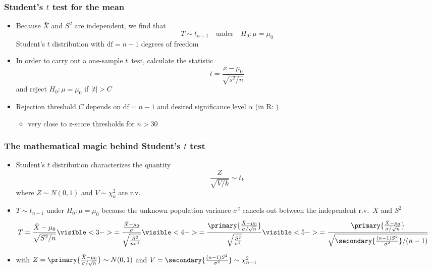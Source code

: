 \documentclass[t]{beamer} %
\begin{document}
\begin{frame}
  \frametitle{Student's $t$ test for the mean}

  \begin{itemize}
  \item Because $\bar{X}$ and $S^2$ are independent, we find that
    \[
    T \sim t_{n-1} \quad\text{under}\quad H_0: \mu = \mu_0
    \]
    Student's \h{$t$ distribution} with $\text{df} = n-1$ degrees of freedom
  \item<2-> In order to carry out a one-sample $t$~test, calculate the statistic
    \[
    t = \frac{\bar{x} - \mu_0}{\sqrt{s^2 / n}}    
    \]
    and reject $H_0: \mu=\mu_0$ if $\lvert t\rvert > C$
  \item<3-> Rejection threshold $C$ depends on $\text{df} = n-1$ and desired
    significance level $\alpha$ (in R: )
    \begin{itemize}
    \item[\hand] very close to z-score thresholds for $n > 30$
    \end{itemize}
  \end{itemize}
\end{frame}

\begin{frame}
  \frametitle{The mathematical magic behind Student's $t$ test}

  \begin{itemize}
  \item Student's $t$ distribution characterizes the quantity
    \[
    \frac{Z}{\sqrt{V / k}} \sim t_k
    \]
    where $Z\sim N(0, 1)$ and $V\sim \chi^2_k$ are  r.v.
  \item<2-> $T\sim t_{n-1}$ under $H_0: \mu = \mu_0$ because the unknown population variance $\sigma^2$ cancels out between the independent r.v.\ $\bar{X}$ and $S^2$
    \begin{align*}
      T &= \frac{\bar{X} - \mu_0}{\sqrt{S^2 / n}}
      \visible<3->{
        = \frac{\frac{\bar{X} - \mu_0}{\sigma}}{\sqrt{\frac{S^2}{n\sigma^2}}}
      }
      \visible<4->{
        = \frac{\primary{\frac{\bar{X} - \mu_0}{\sigma / \sqrt{n}}}}{\sqrt{\frac{S^2}{\sigma^2}}}
      }
      \visible<5->{
        = \frac{\primary{\frac{\bar{X} - \mu_0}{\sigma / \sqrt{n}}}}{\sqrt{\secondary{\frac{(n-1) S^2}{\sigma^2}} / (n-1)}}
      }
    \end{align*}
  \item<6->[] with $Z = \primary{\frac{\bar{X} - \mu_0}{\sigma / \sqrt{n}}} \sim N(0,1)$ and $V = \secondary{\frac{(n-1) S^2}{\sigma^2}} \sim \chi^2_{n-1}$
  \end{itemize}
\end{frame}
\end{document}
